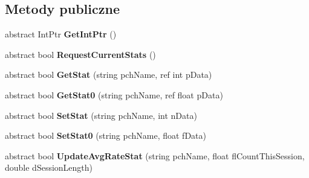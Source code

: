 \subsection*{Metody publiczne}
\begin{DoxyCompactItemize}
\item 
\mbox{\label{class_valve_1_1_steamworks_1_1_i_steam_user_stats_a3621588873bf66cd0403eb0878f7fcc4}} 
abstract Int\+Ptr {\bfseries Get\+Int\+Ptr} ()
\item 
\mbox{\label{class_valve_1_1_steamworks_1_1_i_steam_user_stats_a28f9fa84c093d35eb1783611ec94121a}} 
abstract bool {\bfseries Request\+Current\+Stats} ()
\item 
\mbox{\label{class_valve_1_1_steamworks_1_1_i_steam_user_stats_a82d9c2f62510e7507735aa333bbb51d9}} 
abstract bool {\bfseries Get\+Stat} (string pch\+Name, ref int p\+Data)
\item 
\mbox{\label{class_valve_1_1_steamworks_1_1_i_steam_user_stats_ac901df195e03ac6ed71c2ab8d551e4df}} 
abstract bool {\bfseries Get\+Stat0} (string pch\+Name, ref float p\+Data)
\item 
\mbox{\label{class_valve_1_1_steamworks_1_1_i_steam_user_stats_abc97a34ac155b2a5ff6b066eab992b12}} 
abstract bool {\bfseries Set\+Stat} (string pch\+Name, int n\+Data)
\item 
\mbox{\label{class_valve_1_1_steamworks_1_1_i_steam_user_stats_ab97586fda86fb6e33a51ca313a1b6edb}} 
abstract bool {\bfseries Set\+Stat0} (string pch\+Name, float f\+Data)
\item 
\mbox{\label{class_valve_1_1_steamworks_1_1_i_steam_user_stats_a491ab44f36b878361ffe70b77e473065}} 
abstract bool {\bfseries Update\+Avg\+Rate\+Stat} (string pch\+Name, float fl\+Count\+This\+Session, double d\+Session\+Length)
\item 
\mbox{\label{class_valve_1_1_steamworks_1_1_i_steam_user_stats_ad5e7af4fb419189517d5a35b2477240a}} 

\end{DoxyCompactItemize}
